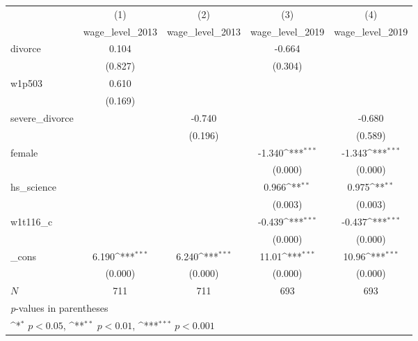 {
\def\sym#1{\ifmmode^{#1}\else\(^{#1}\)\fi}
\begin{tabular}{l*{4}{c}}
\hline\hline
            &\multicolumn{1}{c}{(1)}&\multicolumn{1}{c}{(2)}&\multicolumn{1}{c}{(3)}&\multicolumn{1}{c}{(4)}\\
            &\multicolumn{1}{c}{wage\_level\_2013}&\multicolumn{1}{c}{wage\_level\_2013}&\multicolumn{1}{c}{wage\_level\_2019}&\multicolumn{1}{c}{wage\_level\_2019}\\
\hline
divorce     &       0.104         &                     &      -0.664         &                     \\
            &     (0.827)         &                     &     (0.304)         &                     \\
[1em]
w1p503      &       0.610         &                     &                     &                     \\
            &     (0.169)         &                     &                     &                     \\
[1em]
severe\_divorce&                     &      -0.740         &                     &      -0.680         \\
            &                     &     (0.196)         &                     &     (0.589)         \\
[1em]
female      &                     &                     &      -1.340\sym{***}&      -1.343\sym{***}\\
            &                     &                     &     (0.000)         &     (0.000)         \\
[1em]
hs\_science  &                     &                     &       0.966\sym{**} &       0.975\sym{**} \\
            &                     &                     &     (0.003)         &     (0.003)         \\
[1em]
w1t116\_c    &                     &                     &      -0.439\sym{***}&      -0.437\sym{***}\\
            &                     &                     &     (0.000)         &     (0.000)         \\
[1em]
\_cons      &       6.190\sym{***}&       6.240\sym{***}&       11.01\sym{***}&       10.96\sym{***}\\
            &     (0.000)         &     (0.000)         &     (0.000)         &     (0.000)         \\
\hline
\(N\)       &         711         &         711         &         693         &         693         \\
\hline\hline
\multicolumn{5}{l}{\footnotesize \textit{p}-values in parentheses}\\
\multicolumn{5}{l}{\footnotesize \sym{*} \(p<0.05\), \sym{**} \(p<0.01\), \sym{***} \(p<0.001\)}\\
\end{tabular}
}
